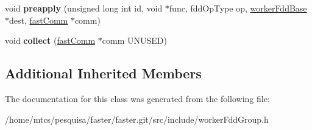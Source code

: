\begin{DoxyCompactItemize}
\item 
\hypertarget{classfaster_1_1workerFddGroup_a40ff7dd73c6fef3a6c6496ea22e30f0f}{}void {\bfseries preapply} (unsigned long int id, void $\ast$func, fdd\+Op\+Type op, \hyperlink{classfaster_1_1workerFddBase}{worker\+Fdd\+Base} $\ast$dest, \hyperlink{classfaster_1_1fastComm}{fast\+Comm} $\ast$comm)\label{classfaster_1_1workerFddGroup_a40ff7dd73c6fef3a6c6496ea22e30f0f}

\item 
\hypertarget{classfaster_1_1workerFddGroup_a59914c39f0345e48932a1ae682efd107}{}void {\bfseries collect} (\hyperlink{classfaster_1_1fastComm}{fast\+Comm} $\ast$comm U\+N\+U\+S\+E\+D)\label{classfaster_1_1workerFddGroup_a59914c39f0345e48932a1ae682efd107}

\end{DoxyCompactItemize}
\subsection*{Additional Inherited Members}


The documentation for this class was generated from the following file\+:\begin{DoxyCompactItemize}
\item 
/home/mtcs/pesquisa/faster/faster.\+git/src/include/worker\+Fdd\+Group.\+h\end{DoxyCompactItemize}
